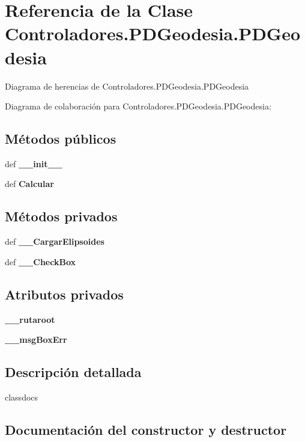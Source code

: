 \section{Referencia de la Clase Controladores.\-P\-D\-Geodesia.\-P\-D\-Geodesia}
\label{classControladores_1_1PDGeodesia_1_1PDGeodesia}


Diagrama de herencias de Controladores.\-P\-D\-Geodesia.\-P\-D\-Geodesia


Diagrama de colaboración para Controladores.\-P\-D\-Geodesia.\-P\-D\-Geodesia\-:
\subsection*{Métodos públicos}
\begin{DoxyCompactItemize}
\item 
def {\bf \-\_\-\-\_\-init\-\_\-\-\_\-}
\item 
def {\bf Calcular}
\end{DoxyCompactItemize}
\subsection*{Métodos privados}
\begin{DoxyCompactItemize}
\item 
def {\bf \-\_\-\-\_\-\-Cargar\-Elipsoides}
\item 
def {\bf \-\_\-\-\_\-\-Check\-Box}
\end{DoxyCompactItemize}
\subsection*{Atributos privados}
\begin{DoxyCompactItemize}
\item 
{\bf \-\_\-\-\_\-rutaroot}
\item 
{\bf \-\_\-\-\_\-msg\-Box\-Err}
\end{DoxyCompactItemize}


\subsection{Descripción detallada}
\begin{DoxyVerb}classdocs
\end{DoxyVerb}
 

\subsection{Documentación del constructor y destructor}
